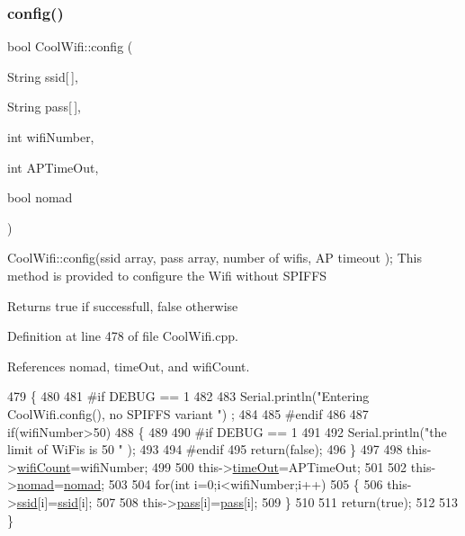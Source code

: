 \subsubsection{\texorpdfstring{config()}{config()}\hspace{0.1cm}{\footnotesize\ttfamily [2/2]}}
{\footnotesize\ttfamily bool Cool\+Wifi\+::config (\begin{DoxyParamCaption}\item[{String}]{ssid\mbox{[}$\,$\mbox{]},  }\item[{String}]{pass\mbox{[}$\,$\mbox{]},  }\item[{int}]{wifi\+Number,  }\item[{int}]{A\+P\+Time\+Out,  }\item[{bool}]{nomad }\end{DoxyParamCaption})}

Cool\+Wifi\+::config(ssid array, pass array, number of wifis, A\+P timeout ); This method is provided to configure the Wifi without S\+P\+I\+F\+FS

\begin{DoxyReturn}{Returns}
true if successfull, false otherwise 
\end{DoxyReturn}


Definition at line 478 of file Cool\+Wifi.\+cpp.



References nomad, time\+Out, and wifi\+Count.


\begin{DoxyCode}
479 \{
480 
481 \textcolor{preprocessor}{#if DEBUG == 1 }
482     
483     Serial.println(\textcolor{stringliteral}{"Entering CoolWifi.config(), no SPIFFS variant "}) ;
484     
485 \textcolor{preprocessor}{#endif}
486     
487     \textcolor{keywordflow}{if}(wifiNumber>50)
488     \{
489     
490 \textcolor{preprocessor}{    #if DEBUG == 1 }
491         
492         Serial.println(\textcolor{stringliteral}{"the limit of WiFis is 50 "} );
493         
494 \textcolor{preprocessor}{    #endif}
495         \textcolor{keywordflow}{return}(\textcolor{keyword}{false});  
496     \}
497 
498     this->\hyperlink{classCoolWifi_ab133bd92fcb895b884deecd6678592e4}{wifiCount}=wifiNumber;
499 
500     this->\hyperlink{classCoolWifi_a952111605f25156588b5632caaba1c6f}{timeOut}=APTimeOut;
501 
502     this->\hyperlink{classCoolWifi_ab7d9643c4af7bac3be331ef008b2ea27}{nomad}=\hyperlink{classCoolWifi_ab7d9643c4af7bac3be331ef008b2ea27}{nomad};
503     
504     \textcolor{keywordflow}{for}(\textcolor{keywordtype}{int} i=0;i<wifiNumber;i++)
505     \{
506         this->\hyperlink{classCoolWifi_a893b21d0fed821438733bba2e73fb4c2}{ssid}[i]=\hyperlink{classCoolWifi_a893b21d0fed821438733bba2e73fb4c2}{ssid}[i];
507         
508         this->\hyperlink{classCoolWifi_a0c3332a149245aaad060b32593a54c9b}{pass}[i]=\hyperlink{classCoolWifi_a0c3332a149245aaad060b32593a54c9b}{pass}[i];
509     \}
510         
511     \textcolor{keywordflow}{return}(\textcolor{keyword}{true});
512 
513 \}
\end{DoxyCode}
\mbox{\label{classCoolWifi_ad060353050f40d032a2dbf9e54a768bf}} 
